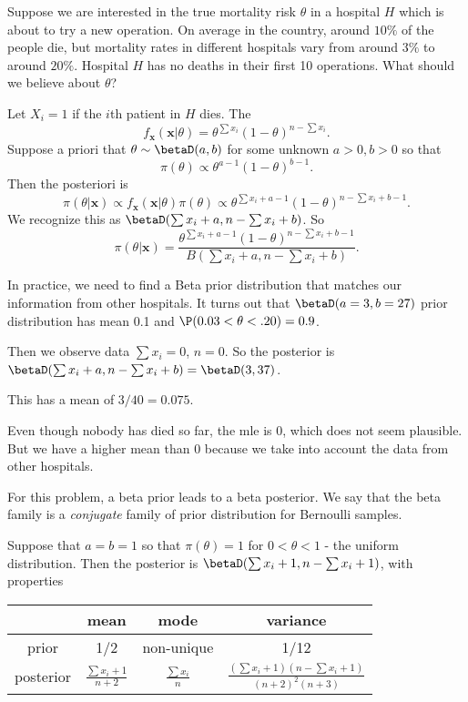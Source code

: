 \documentclass[a4paper]{article}
\begin{document}
\begin{eg}
  Suppose we are interested in the true mortality risk $\theta$ in a hospital $H$ which is about to try a new operation. On average in the country, around $10\%$ of the people die, but mortality rates in different hospitals vary from around $3\%$ to around $20\%$. Hospital $H$ has no deaths in their first 10 operations. What should we believe about $\theta$?

  Let $X_i = 1$ if the $i$th patient in $H$ dies. The
  \[
    f_{\mathbf{x}}(\mathbf{x}|\theta) = \theta^{\sum x_i}(1 - \theta)^{n - \sum x_i}.
  \]
  Suppose a priori that $\theta\sim \betaD(a, b)$ for some unknown $a > 0, b > 0$ so that
  \[
    \pi(\theta)\propto \theta^{a - 1}(1 - \theta)^{b - 1}.
  \]
  Then the posteriori is
  \[
    \pi(\theta|\mathbf{x})\propto f_{\mathbf{x}}(\mathbf{x}|\theta)\pi(\theta)\propto \theta^{\sum x_i + a - 1}(1 - \theta)^{n- \sum x_i + b - 1}.
  \]
  We recognize this as $\betaD(\sum x_i + a, n - \sum x_i + b)$. So
  \[
    \pi(\theta|\mathbf{x}) = \frac{\theta^{\sum x_i + a - 1}(1 - \theta)^{n - \sum x_i + b - 1}}{B(\sum x_i + a, n - \sum x_i + b)}.
  \]

  In practice, we need to find a Beta prior distribution that matches our information from other hospitals. It turns out that $\betaD(a = 3, b = 27)$ prior distribution has mean 0.1 and $\P(0.03 < \theta < .20) = 0.9$.

  Then we observe data $\sum x_i = 0$, $n = 0$. So the posterior is $\betaD(\sum x_i + a, n - \sum x_i + b) = \betaD(3, 37)$.

  This has a mean of $3/40 = 0.075$.

  Even though nobody has died so far, the mle is $0$, which does not seem plausible. But we have a higher mean than $0$ because we take into account the data from other hospitals.
\end{eg}

For this problem, a beta prior leads to a beta posterior. We say that the beta family is a \emph{conjugate} family of prior distribution for Bernoulli samples.

Suppose that $a = b = 1$ so that $\pi (\theta) = 1$ for $0 < \theta < 1$ - the uniform distribution. Then the posterior is $\betaD(\sum x_i + 1, n - \sum x_i + 1)$, with properties

\begin{tabular}[]{cccc}
  \toprule
  &mean & mode & variance\\
  \midrule
  prior & 1/2 & non-unique & 1/12\\
  posterior & $\displaystyle \frac{\sum x_i + 1}{n + 2}$ & $\displaystyle \frac{\sum x_i}{n}$ & $\displaystyle\frac{(\sum x_i + 1)(n - \sum x_i + 1)}{(n + 2)^2(n + 3)}$\\
  \bottomrule
\end{tabular}
\end{document}
